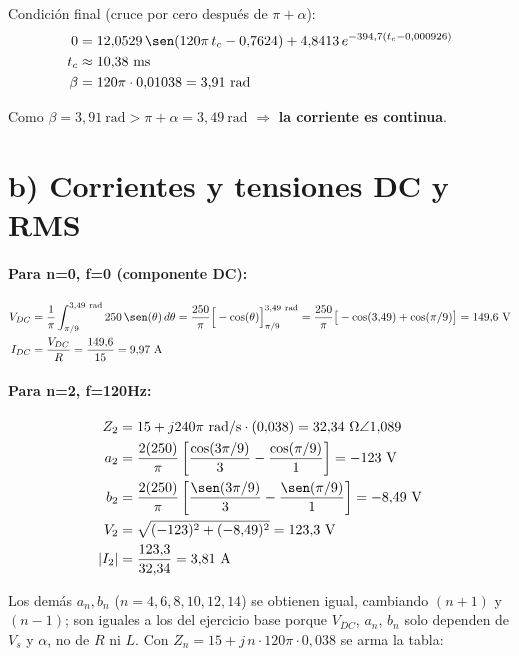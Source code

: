 \documentclass[11pt]{article}
\begin{document}
Condici\'on final (cruce por cero despu\'es de $\pi+\alpha$):
\begin{align*}
0 &= 12{,}0529\,\sen(120\pi\,t_c - 0{,}7624) + 4{,}8413\,e^{-394{,}7(t_c - 0{,}000926)} \\
t_c &\approx 10{,}38\ \text{ms} \\
\beta &= 120\pi \cdot 0{,}01038 = 3{,}91\ \text{rad}
\end{align*}

Como $\beta = 3{,}91\ \text{rad} > \pi+\alpha = 3{,}49\ \text{rad}$
$\Rightarrow$ \textbf{la corriente es continua}.

\section*{b) Corrientes y tensiones DC y RMS}

\paragraph{Para n=0, f=0 (componente DC):}
\begin{align*}
V_{DC} &= \frac{1}{\pi}\int_{\pi/9}^{3{,}49\ \text{rad}} 250\,\sen(\theta)\,d\theta
       = \frac{250}{\pi}\Big[-\cos(\theta)\Big]_{\pi/9}^{3{,}49\ \text{rad}}
       = \frac{250}{\pi}\big[-\cos(3{,}49)+\cos(\pi/9)\big] = 149{,}6\ \text{V} \\
I_{DC} &= \frac{V_{DC}}{R} = \frac{149{,}6}{15} = 9{,}97\ \text{A}
\end{align*}

\paragraph{Para n=2, f=120Hz:}
\begin{align*}
Z_2 &= 15 + j240\pi\ \text{rad/s}\cdot(0{,}038) = 32{,}34\ \Omega\angle 1{,}089 \\
a_2 &= \frac{2(250)}{\pi}\left[\frac{\cos(3\pi/9)}{3} - \frac{\cos(\pi/9)}{1}\right] = -123\ \text{V} \\
b_2 &= \frac{2(250)}{\pi}\left[\frac{\sen(3\pi/9)}{3} - \frac{\sen(\pi/9)}{1}\right] = -8{,}49\ \text{V} \\
V_2 &= \sqrt{(-123)^2+(-8{,}49)^2} = 123{,}3\ \text{V} \\
|I_2| &= \frac{123{,}3}{32{,}34} = 3{,}81\ \text{A}
\end{align*}

Los dem\'as $a_n, b_n$ ($n=4,6,8,10,12,14$) se obtienen igual, cambiando $(n+1)$
y $(n-1)$; son iguales a los del ejercicio base porque $V_{DC}$, $a_n$, $b_n$
solo dependen de $V_s$ y $\alpha$, no de $R$ ni $L$. Con $Z_n = 15 + j\,n\cdot120\pi\cdot0{,}038$
se arma la tabla:
\end{document}
